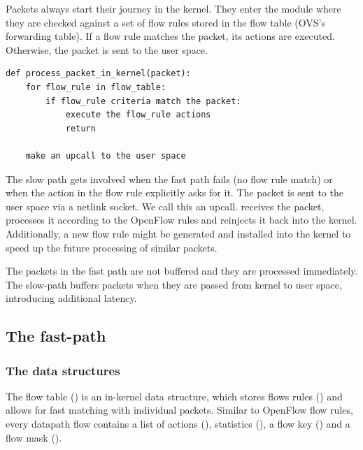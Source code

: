 Packets always start their journey in the kernel. They enter the  module where they are checked against a set of flow rules stored in the flow table (OVS's forwarding table). If a flow rule matches the packet, its actions are executed. Otherwise, the packet is sent to the user space.

 \begin{verbatim}
def process_packet_in_kernel(packet):
    for flow_rule in flow_table:
        if flow_rule criteria match the packet:
            execute the flow_rule actions
            return
    
    make an upcall to the user space
 \end{verbatim}

The slow path gets involved when the fast path fails (no flow rule match) or when the action in the flow rule explicitly asks for it. The packet is sent to the user space via a netlink socket. We call this an upcall.  receives the packet, processes it according to the OpenFlow rules and reinjects it back into the kernel. Additionally, a new flow rule might be generated and installed into the kernel to speed up the future processing of similar packets.

The packets in the fast path are not buffered and they are processed immediately. The slow-path buffers packets when they are passed from kernel to user space, introducing additional latency.

\subsection{The fast-path}
\label{the-fast-path}

\subsubsection{The data structures}
\label{the-data-structures}

The flow table (\href{https://elixir.bootlin.com/linux/v6.2.6/source/net/openvswitch/flow_table.h\#L62}{}) is an in-kernel data structure, which stores flows rules (\href{https://elixir.bootlin.com/linux/v6.2.6/source/net/openvswitch/flow.h\#L221}{}) and allows for fast matching with individual packets. Similar to OpenFlow flow rules, every datapath flow contains a list of actions (\href{https://elixir.bootlin.com/linux/v6.2.6/source/net/openvswitch/flow.h\#L206}{}), statistics (\href{https://elixir.bootlin.com/linux/v6.2.6/source/net/openvswitch/flow.h\#L213}{}), a flow key (\href{https://elixir.bootlin.com/linux/v6.2.6/source/net/openvswitch/flow.h\#L75}{}) and a flow mask (\href{https://elixir.bootlin.com/linux/v6.2.6/source/net/openvswitch/flow.h\#L183}{}).

